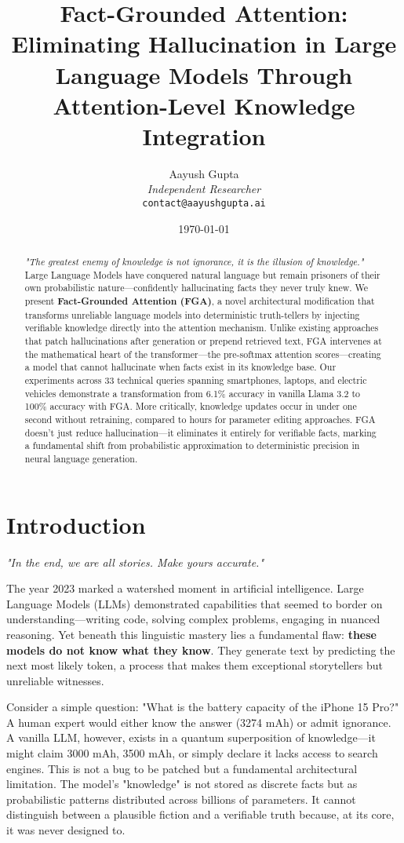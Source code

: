 \documentclass[11pt, a4paper]{article}
\title{\textbf{Fact-Grounded Attention: \\ Eliminating Hallucination in Large Language Models Through \\ Attention-Level Knowledge Integration}}
\author{
Aayush Gupta \\
\textit{Independent Researcher} \\
\texttt{contact@aayushgupta.ai}
}
\date{\today}
\theoremstyle{definition}
\begin{document}
\maketitle

\begin{abstract}
\textit{"The greatest enemy of knowledge is not ignorance, it is the illusion of knowledge."} Large Language Models have conquered natural language but remain prisoners of their own probabilistic nature—confidently hallucinating facts they never truly knew. We present \textbf{Fact-Grounded Attention (FGA)}, a novel architectural modification that transforms unreliable language models into deterministic truth-tellers by injecting verifiable knowledge directly into the attention mechanism. Unlike existing approaches that patch hallucinations after generation or prepend retrieved text, FGA intervenes at the mathematical heart of the transformer—the pre-softmax attention scores—creating a model that cannot hallucinate when facts exist in its knowledge base. Our experiments across 33 technical queries spanning smartphones, laptops, and electric vehicles demonstrate a transformation from 6.1\% accuracy in vanilla Llama 3.2 to 100\% accuracy with FGA. More critically, knowledge updates occur in under one second without retraining, compared to hours for parameter editing approaches. FGA doesn't just reduce hallucination—it eliminates it entirely for verifiable facts, marking a fundamental shift from probabilistic approximation to deterministic precision in neural language generation.
\end{abstract}

\section{Introduction}

\textit{"In the end, we are all stories. Make yours accurate."}

The year 2023 marked a watershed moment in artificial intelligence. Large Language Models (LLMs) demonstrated capabilities that seemed to border on understanding—writing code, solving complex problems, engaging in nuanced reasoning. Yet beneath this linguistic mastery lies a fundamental flaw: \textbf{these models do not know what they know}. They generate text by predicting the next most likely token, a process that makes them exceptional storytellers but unreliable witnesses.

Consider a simple question: "What is the battery capacity of the iPhone 15 Pro?" A human expert would either know the answer (3274 mAh) or admit ignorance. A vanilla LLM, however, exists in a quantum superposition of knowledge—it might claim 3000 mAh, 3500 mAh, or simply declare it lacks access to search engines. This is not a bug to be patched but a fundamental architectural limitation. The model's "knowledge" is not stored as discrete facts but as probabilistic patterns distributed across billions of parameters. It cannot distinguish between a plausible fiction and a verifiable truth because, at its core, it was never designed to.
\end{document}
